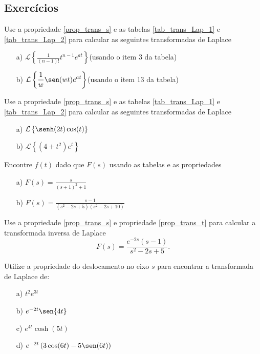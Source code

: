 \subsection*{Exercícios}
\begin{exer}Use a propriedade \ref{prop_trans_s} e as tabelas \ref{tab_trans_Lap_1} e \ref{tab_trans_Lap_2} para calcular as seguintes transformadas de Laplace
\begin{itemize}
 \item[a)] $\displaystyle \mathcal{L}\left\{\frac{1}{(n-1)!}t^{n-1}e^{at}\right\}$\qquad (usando o item 3 da tabela)
 \item[b)] $\displaystyle \mathcal{L}\left\{\frac{1}{w}\sen(wt)e^{at}\right\}$\qquad (usando o item 13 da tabela)
\end{itemize}
\end{exer}
\begin{exer}Use a propriedade \ref{prop_trans_s} e as tabelas \ref{tab_trans_Lap_1} e \ref{tab_trans_Lap_2} para calcular as seguintes transformadas de Laplace
\begin{itemize}
 \item[a)] $\displaystyle \mathcal{L}\left\{\senh(2t)\cos(t)\right\}$
 \item[b)] $\displaystyle \mathcal{L}\left\{(4+t^2)e^t\right\}$
\end{itemize}
\end{exer}
\begin{exer}Encontre $f(t)$ dado que $F(s)$ usando as tabelas e as propriedades
\begin{itemize}
 \item[a)] $F(s)=\frac{s}{(s+1)^2+1}$
\item[b)] $F(s)=\frac{s-1}{(s^2-2s+5)(s^2-2s+10)}$
\end{itemize}
\end{exer}
\begin{exer}Use a propriedade \ref{prop_trans_s} e propriedade \ref{prop_trans_t} para calcular a transformada inversa de Laplace
\begin{equation}
F(s)=\frac{e^{-2s}(s-1)}{s^2 -2s+5}.
\end{equation}
\end{exer}
\begin{exer}
Utilize a propriedade do deslocamento no eixo $s$ para encontrar a transformada de Laplace de:
\begin{itemize}
  \item[a)] $t^2 e^{3t}$
  \item[b)] $e^{-2t} \sen {4t}$
  \item[c)] $e^{4t} \cosh (5t)$
  \item[d)] $e^{-2t} \left( 3 \cos(6t) - 5 \sen (6t) \right)$
  \end{itemize}
\end{exer}
